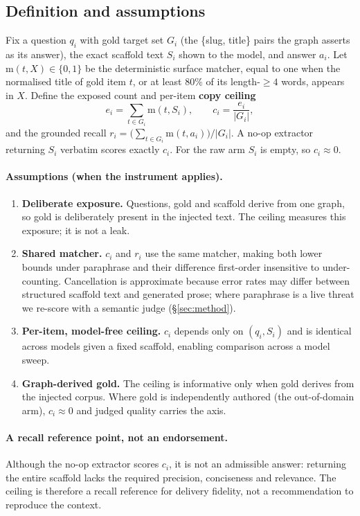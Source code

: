 \documentclass[10pt,twocolumn]{article}
\begin{document}
\subsection{Definition and assumptions}
Fix a question $q_i$ with gold target set $G_i$ (the \{slug, title\} pairs the graph asserts as its answer), the exact scaffold text $S_i$ shown to the model, and answer $a_i$. Let $\mathrm{m}(t,X)\in\{0,1\}$ be the deterministic surface matcher, equal to one when the normalised title of gold item $t$, or at least $80\%$ of its length-$\geq4$ words, appears in $X$. Define the exposed count and per-item \textbf{copy ceiling}
\[
  e_i=\sum_{t\in G_i}\mathrm{m}(t,S_i),\qquad
  c_i=\frac{e_i}{|G_i|},
\]
and the grounded recall $r_i=\bigl(\sum_{t\in G_i}\mathrm{m}(t,a_i)\bigr)/|G_i|$. A no-op extractor returning $S_i$ verbatim scores exactly $c_i$. For the raw arm $S_i$ is empty, so $c_i\approx0$.

\paragraph{Assumptions (when the instrument applies).}
\begin{enumerate}[label=(A\arabic*),topsep=2pt,itemsep=1pt,leftmargin=2.4em]
\item \textbf{Deliberate exposure.} Questions, gold and scaffold derive from one graph, so gold is deliberately present in the injected text. The ceiling measures this exposure; it is not a leak.
\item \textbf{Shared matcher.} $c_i$ and $r_i$ use the same matcher, making both lower bounds under paraphrase and their difference first-order insensitive to under-counting. Cancellation is approximate because error rates may differ between structured scaffold text and generated prose; where paraphrase is a live threat we re-score with a semantic judge (\S\ref{sec:method}).
\item \textbf{Per-item, model-free ceiling.} $c_i$ depends only on $(q_i,S_i)$ and is identical across models given a fixed scaffold, enabling comparison across a model sweep.
\item \textbf{Graph-derived gold.} The ceiling is informative only when gold derives from the injected corpus. Where gold is independently authored (the out-of-domain arm), $c_i\approx0$ and judged quality carries the axis.
\end{enumerate}

\paragraph{A recall reference point, not an endorsement.} Although the no-op extractor scores $c_i$, it is not an admissible answer: returning the entire scaffold lacks the required precision, conciseness and relevance. The ceiling is therefore a recall reference for delivery fidelity, not a recommendation to reproduce the context.
\end{document}
